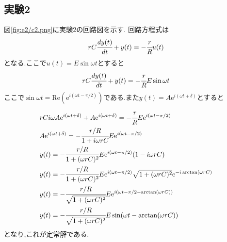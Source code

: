 \subsection{実験2}
図\ref{fig:e2/c2.png}に実験2の回路図を示す.
回路方程式は
\begin{align}
  rC\cfrac{dy(t)}{dt}+y(t)=-\cfrac{r}{R}u(t)
\end{align}
となる.ここで$u(t)=E\sin\omega t$とすると
\begin{align}
  rC\cfrac{dy(t)}{dt}+y(t)=-\cfrac{r}{R}E\sin\omega t
\end{align}
ここで$\sin\omega t=\mathrm{Re}(\mathrm{e}^{i(\omega t-\pi/2)})$である.また$y(t)=A\mathrm{e}^{i(\omega t+\delta)}$とすると
\begin{align}
  &rCi\omega A\mathrm{e}^{i(\omega t+\delta)}+A\mathrm{e}^{i(\omega t+\delta)}=-\cfrac{r}{R}E\mathrm{e}^{i(\omega t-\pi/2)}\\
  &A\mathrm{e}^{i(\omega t+\delta)}=-\cfrac{r/R}{1+i\omega rC}E\mathrm{e}^{i(\omega t-\pi/2)}\\
  &y(t)=-\cfrac{r/R}{1+(\omega rC)^2}E\mathrm{e}^{i(\omega t-\pi/2)}(1-i\omega rC)\\
  &y(t)=-\cfrac{r/R}{1+(\omega rC)^2}E\mathrm{e}^{i(\omega t-\pi/2)}\sqrt{1+(\omega rC)^2}\mathrm{e}^{-i\arctan(\omega rC)}\\
  &y(t)=-\cfrac{r/R}{\sqrt{1+(\omega rC)^2}}E\mathrm{e}^{i(\omega t-\pi/2-\arctan(\omega rC))}\\
  &y(t)=-\cfrac{r/R}{\sqrt{1+(\omega rC)^2}}E\sin(\omega t-\arctan(\omega rC))
\end{align}
となり,これが定常解である.
